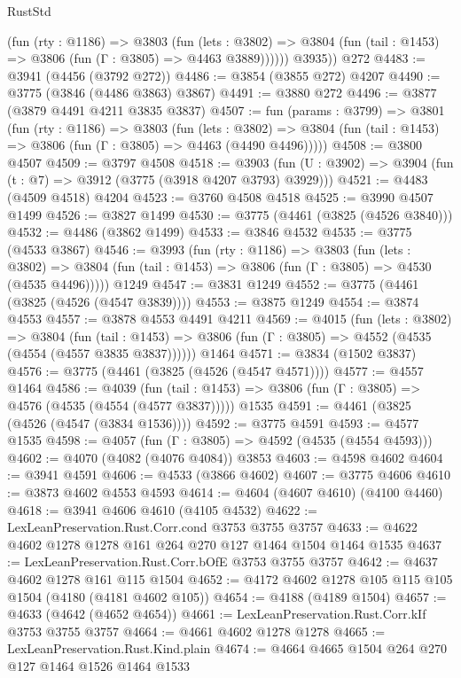 \begin{lexlean}{RustStd}
\begin{coremodule}
{\begin{coremodule}
{{{{{{{{{{{{{{{{{{{{{{{{{{{{{{{            (fun (rty : @1186) =>
            @3803
              (fun (lets : @3802) =>
              @3804 (fun (tail : @1453) => @3806 (fun (Γ : @3805) => @4463 @3889))))))
        @3935))
    @272
@4483 := @3941 (@4456 (@3792 @272))
@4486 := @3854 (@3855 @272) @4207
@4490 := @3775 (@3846 (@4486 @3863) @3867)
@4491 := @3880 @272
@4496 := @3877 (@3879 @4491 @4211 @3835 @3837)
@4507 := fun (params : @3799) =>
  @3801
    (fun (rty : @1186) =>
    @3803
      (fun (lets : @3802) =>
      @3804 (fun (tail : @1453) => @3806 (fun (Γ : @3805) => @4463 (@4490 @4496)))))
@4508 := @3800 @4507
@4509 := @3797 @4508
@4518 := @3903 (fun (U : @3902) => @3904 (fun (t : @7) => @3912 (@3775 (@3918 @4207 @3793) @3929)))
@4521 := @4483 (@4509 @4518) @4204
@4523 := @3760 @4508 @4518
@4525 := @3990 @4507 @1499
@4526 := @3827 @1499
@4530 := @3775 (@4461 (@3825 (@4526 @3840)))
@4532 := @4486 (@3862 @1499)
@4533 := @3846 @4532
@4535 := @3775 (@4533 @3867)
@4546 := @3993
    (fun (rty : @1186) =>
    @3803
      (fun (lets : @3802) =>
      @3804 (fun (tail : @1453) => @3806 (fun (Γ : @3805) => @4530 (@4535 @4496)))))
    @1249
@4547 := @3831 @1249
@4552 := @3775 (@4461 (@3825 (@4526 (@4547 @3839))))
@4553 := @3875 @1249
@4554 := @3874 @4553
@4557 := @3878 @4553 @4491 @4211
@4569 := @4015
    (fun (lets : @3802) =>
    @3804
      (fun (tail : @1453) => @3806 (fun (Γ : @3805) => @4552 (@4535 (@4554 (@4557 @3835 @3837))))))
    @1464
@4571 := @3834 (@1502 @3837)
@4576 := @3775 (@4461 (@3825 (@4526 (@4547 @4571))))
@4577 := @4557 @1464
@4586 := @4039
    (fun (tail : @1453) => @3806 (fun (Γ : @3805) => @4576 (@4535 (@4554 (@4577 @3837)))))
    @1535
@4591 := @4461 (@3825 (@4526 (@4547 (@3834 @1536))))
@4592 := @3775 @4591
@4593 := @4577 @1535
@4598 := @4057 (fun (Γ : @3805) => @4592 (@4535 (@4554 @4593)))
@4602 := @4070 (@4082 (@4076 @4084)) @3853
@4603 := @4598 @4602
@4604 := @3941 @4591
@4606 := @4533 (@3866 @4602)
@4607 := @3775 @4606
@4610 := @3873 @4602 @4553 @4593
@4614 := @4604 (@4607 @4610) (@4100 @4460)
@4618 := @3941 @4606 @4610 (@4105 @4532)
@4622 := LexLeanPreservation.Rust.Corr.cond @3753 @3755 @3757
@4633 := @4622 @4602 @1278 @1278 @161 @264 @270 @127 @1464 @1504 @1464 @1535
@4637 := LexLeanPreservation.Rust.Corr.bOfE @3753 @3755 @3757
@4642 := @4637 @4602 @1278 @161 @115 @1504
@4652 := @4172 @4602 @1278 @105 @115 @105 @1504 (@4180 (@4181 @4602 @105))
@4654 := @4188 (@4189 @1504)
@4657 := @4633 (@4642 (@4652 @4654))
@4661 := LexLeanPreservation.Rust.Corr.kIf @3753 @3755 @3757
@4664 := @4661 @4602 @1278 @1278
@4665 := LexLeanPreservation.Rust.Kind.plain
@4674 := @4664 @4665 @1504 @264 @270 @127 @1464 @1526 @1464 @1533
}}}}}}}}}}}}}}}}}}}}}}}}}}}}}}}
\end{coremodule}}
\end{coremodule}
\end{lexlean}
